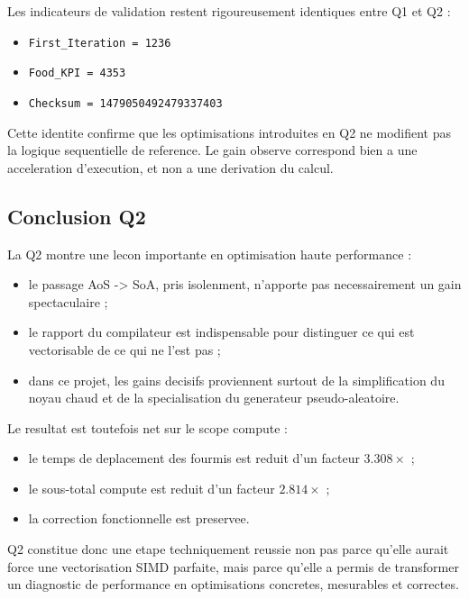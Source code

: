 \documentclass[11pt,a4paper]{article}
\begin{document}
Les indicateurs de validation restent rigoureusement identiques entre Q1 et Q2 :

\begin{itemize}[leftmargin=1.2em]
  \item \texttt{First\_Iteration = 1236}
  \item \texttt{Food\_KPI = 4353}
  \item \texttt{Checksum = 1479050492479337403}
\end{itemize}

Cette identite confirme que les optimisations introduites en Q2 ne modifient pas la logique sequentielle de reference. Le gain observe correspond bien a une acceleration d'execution, et non a une derivation du calcul.

\subsection{Conclusion Q2}

La Q2 montre une lecon importante en optimisation haute performance :

\begin{itemize}[leftmargin=1.2em]
  \item le passage AoS -> SoA, pris isolenment, n'apporte pas necessairement un gain spectaculaire ;
  \item le rapport du compilateur est indispensable pour distinguer ce qui est vectorisable de ce qui ne l'est pas ;
  \item dans ce projet, les gains decisifs proviennent surtout de la simplification du noyau chaud et de la specialisation du generateur pseudo-aleatoire.
\end{itemize}

Le resultat est toutefois net sur le scope compute :

\begin{itemize}[leftmargin=1.2em]
  \item le temps de deplacement des fourmis est reduit d'un facteur \(3.308\times\) ;
  \item le sous-total compute est reduit d'un facteur \(2.814\times\) ;
  \item la correction fonctionnelle est preservee.
\end{itemize}

Q2 constitue donc une etape techniquement reussie non pas parce qu'elle aurait force une vectorisation SIMD parfaite, mais parce qu'elle a permis de transformer un diagnostic de performance en optimisations concretes, mesurables et correctes.
\end{document}
